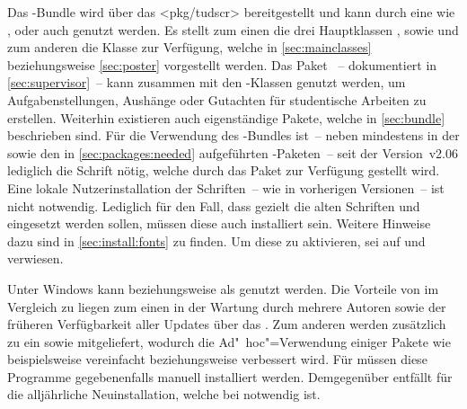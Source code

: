 %
Das \TUDScript-Bundle wird über das \CTAN<pkg/tudscr> bereitgestellt und kann 
durch eine \Distro wie \TeXLive, \MacTeX oder auch \MiKTeX genutzt werden. Es 
stellt zum einen die drei Hauptklassen ,  
sowie  und zum anderen die Klasse  zur 
Verfügung, welche in \autoref{sec:mainclasses} beziehungsweise 
\autoref{sec:poster} vorgestellt werden. Das Paket 
~-- dokumentiert in \autoref{sec:supervisor}~-- kann 
zusammen mit den \TUDScript-Klassen genutzt werden, um Aufgabenstellungen, 
Aushänge oder Gutachten für studentische Arbeiten zu erstellen. Weiterhin 
existieren auch eigenständige Pakete, welche in \autoref{sec:bundle} 
beschrieben sind. Für die Verwendung des \TUDScript-Bundles ist~-- neben 
\KOMAScript mindestens in der  sowie den in 
\autoref{sec:packages:needed} aufgeführten -Paketen~-- seit 
der Version~v2.06 lediglich die Schrift \OpenSans nötig, welche durch das Paket 
 zur Verfügung gestellt wird. Eine lokale Nutzerinstallation 
der Schriften~-- wie in vorherigen Versionen~-- ist nicht notwendig. Lediglich 
für den Fall, dass gezielt die alten Schriften \Univers und \DIN eingesetzt 
werden sollen, müssen diese auch installiert sein. Weitere Hinweise dazu sind 
in \autoref{sec:install:fonts} zu finden. Um diese zu aktivieren, sei auf 
 und  verwiesen.



Unter Windows kann \TeXLive beziehungsweise \MiKTeX als \Distro genutzt werden. 
Die Vorteile von \TeXLive im Vergleich zu \MiKTeX liegen zum einen in der 
Wartung durch mehrere Autoren sowie der früheren Verfügbarkeit aller Updates 
über das \CTAN. Zum anderen werden zusätzlich zu  ein 
 sowie  mitgeliefert, 
wodurch die Ad"~hoc"=Verwendung einiger Pakete wie beispielsweise 
 vereinfacht beziehungsweise verbessert wird. Für 
\MiKTeX müssen diese Programme gegebenenfalls manuell installiert werden. 
Demgegenüber entfällt für \MiKTeX die alljährliche Neuinstallation, welche 
bei \TeXLive notwendig ist.


